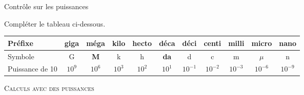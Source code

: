 \documentclass[10pt,addpoints,answers]{exam}
\begin{document}
\begin{center}
    \Huge{Contrôle sur les puissances}
\end{center}

\newcommand{\sol}[1]
{%
\ifprintanswers \textbf{#1} \fi%
}

\unframedsolutions

\begin{questions}

\question[2] Compléter le tableau ci-dessous.

\begin{table}[h!]
    \centering
    \begin{tabular}{|l|c|c|c|c|c|c|c|c|c|c|}\hline
    Préfixe & giga & méga & kilo & hecto & déca & déci & centi & milli & \sol{micro} & nano  \\\hline
    Symbole & G & \sol{M} & k & h & \sol{da} & d & c & m & $\mu$ & n \\\hline
    Puissance de 10\phantom{$1^{2^3}$} & $10^9$ & $10^6$ & $10^3$ & $10^2$ & $10^1$ & $10^{-1}$ & \sol{$10^{-2}$} & $10^{-3}$ & $10^{-6}$ & $10^{-9}$ \\\hline
    \end{tabular}
\end{table}

\question[4] \textsc{Calculs avec des puissances}


\end{questions}
\end{document}
